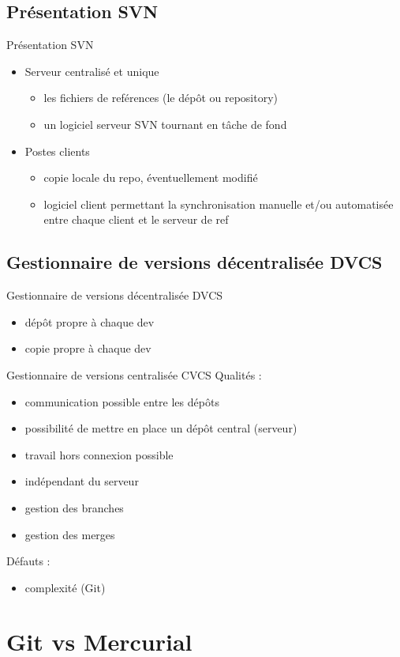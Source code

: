 \documentclass{beamer}
\begin{document}
  \subsection{Présentation SVN}
  \begin{frame}{Présentation SVN}
    \begin{itemize}

      \item{Serveur centralisé et unique}
      \begin{itemize}
          \item{les fichiers de reférences (le dépôt ou repository)}
          \item{un logiciel serveur SVN tournant en tâche de fond}
      \end{itemize}

      \item{Postes clients}
      \begin{itemize}
          \item{copie locale du repo, éventuellement modifié}
          \item{logiciel client permettant la synchronisation manuelle et/ou
                automatisée entre chaque client et le serveur de ref}
      \end{itemize}

    \end{itemize}
  \end{frame}

  \subsection{Gestionnaire de versions décentralisée DVCS}
  \begin{frame}{Gestionnaire de versions décentralisée DVCS}
    \begin{itemize}
      \item{dépôt propre à chaque dev}
      \item{copie propre à chaque dev}
    \end{itemize}
  \end{frame}

  \begin{frame}{Gestionnaire de versions centralisée CVCS}
    Qualités :
    \begin{itemize}
      \item{communication possible entre les dépôts}
      \item{possibilité de mettre en place un dépôt central (serveur)}
      \item{travail hors connexion possible}
      \item{indépendant du serveur}
      \item{gestion des branches}
      \item{gestion des merges}
    \end{itemize}

    Défauts :
    \begin{itemize}
      \item{complexité (Git)}
    \end{itemize}
  \end{frame}

  \section{Git vs Mercurial}
\end{document}

